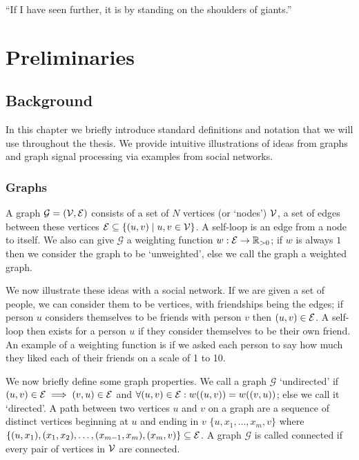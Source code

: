 \begin{savequote}[8cm]
``If I have seen further, it is by standing on the shoulders of giants.''
\end{savequote}

\chapter{\label{ch:2-litreview}Preliminaries}


\section{Background}
In this chapter we briefly introduce standard definitions and notation that we will use throughout the thesis. We provide intuitive illustrations of ideas from graphs and graph signal processing via examples from social networks.

\subsection{Graphs}

A graph $\mathcal{G} = (\mathcal{V}, \mathcal{E})$ consists of a set of $N$ vertices (or `nodes') $\mathcal{V}$, a set of edges between these vertices $\mathcal{E} \subseteq \{ (u,v) \mid u,v \in \mathcal{V} \}$. A self-loop is an edge from a node to itself. We also can give $\mathcal{G}$ a weighting function $w: \mathcal{E} \to \mathbb{R}_{>0}$; if $w$ is always $1$ then we consider the graph to be `unweighted', else we call the graph a weighted graph.

We now illustrate these ideas with a social network. If we are given a set of people, we can consider them to be vertices, with friendships being the edges; if person $u$ considers themselves to be friends with person $v$ then $(u,v) \in \mathcal{E}$. A self-loop then exists for a person $u$ if they consider themselves to be their own friend. An example of a weighting function is if we asked each person to say how much they liked each of their friends on a scale of 1 to 10.

We now briefly define some graph properties. We call a graph $\mathcal{G}$ `undirected' if $(u,v) \in \mathcal{E} \implies (v,u) \in \mathcal{E}$ and $\forall (u,v) \in \mathcal{E}: w((u,v)) = w((v,u))$; else we call it `directed'. A path between two vertices $u$ and $v$ on a graph are a sequence of distinct vertices beginning at $u$ and ending in $v$ $\{u,x_{1},\ldots,x_{m},v\}$ where $\{(u,x_{1}), (x_{1},x_{2}),\ldots,(x_{m-1},x_{m}),(x_{m},v)\} \subseteq \mathcal{E}$. A graph $\mathcal{G}$ is called connected if every pair of vertices in $\mathcal{V}$ are connected.

